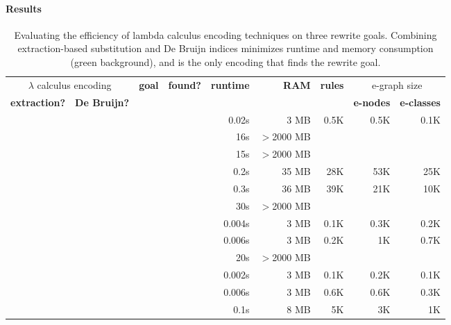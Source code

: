 \paragraph{Results}


\newcommand{\yes}{\ding{51}}
\newcommand{\no}{\ding{55}}
\begin{table}[b]
\small
\begin{tabular}{|c|c|c|c|r|r|r|r|r|} \hline
\multicolumn{2}{|c|}{$\lambda$ calculus encoding} & \multirow{2}{*}{\textbf{goal}} & \multirow{2}{*}{\textbf{found?}} & \multirow{2}{*}{\textbf{runtime}} & \multirow{2}{*}{\textbf{RAM}} & \multirow{2}{*}{\textbf{rules}} & \multicolumn{2}{c|}{e-graph size} \\ \cline{1-2}\cline{8-9}
\textbf{\footnotesize extraction?} & \textbf{\footnotesize De Bruijn?} &&&&&& \textbf{\footnotesize e-nodes} & \textbf{\footnotesize e-classes} \\ \hline \hline
\no & \no & \reductionGoal{} & \yes & 0.02s & 3 MB & 0.5K & 0.5K & 0.1K \\ \hline
\no & \no & \fission{} & \color{red}\no & 16s & $>$2000 MB &  &  &  \\ \hline
\no & \no & \binomial{} & \color{red}\no & 15s & $>$2000 MB &  &  &  \\ \hline \hline

\no & \yes & \reductionGoal{} & \yes & 0.2s & 35 MB & 28K & 53K & 25K \\ \hline
\no & \yes & \fission{} & \yes & 0.3s & 36 MB & 39K & 21K & 10K \\ \hline
\no & \yes & \binomial{} & \color{red}\no & 30s & $>$2000 MB &  &  &  \\ \hline \hline

\yes & \no & \reductionGoal{} & \yes & 0.004s & 3 MB & 0.1K & 0.3K & 0.2K \\ \hline
\yes & \no & \fission{} & \yes & 0.006s & 3 MB & 0.2K & 1K & 0.7K \\ \hline
\yes & \no & \binomial{} & \color{red}\no & 20s & $>$2000 MB &  &  &  \\ \hline \hline

\rowcolor{green!45}
\yes & \yes & \reductionGoal{} & \yes & 0.002s & 3 MB & 0.1K & 0.2K & 0.1K \\ \hline
\rowcolor{green!45}
\yes & \yes & \fission{} & \yes & 0.006s & 3 MB & 0.6K & 0.6K & 0.3K \\ \hline
\rowcolor{green!45}
\yes & \yes & \binomial{} & \yes & 0.1s & 8 MB & 5K & 3K & 1K \\ \hline
\end{tabular}
\caption{Evaluating the efficiency of lambda calculus encoding techniques on three rewrite goals.
Combining extraction-based substitution and De Bruijn indices minimizes runtime and memory consumption (green background), and is the only encoding that finds the \binomial{} rewrite goal.}
\label{fig:lambda-res}
\end{table}

